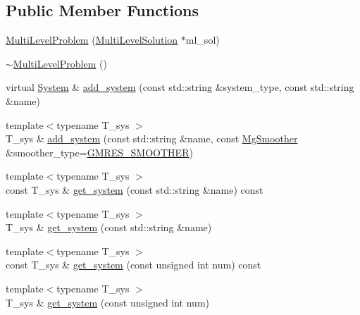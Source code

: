\subsection*{Public Member Functions}
\begin{DoxyCompactItemize}
\item 
\mbox{\hyperlink{classfemus_1_1_multi_level_problem_aa367975a9b81eff0bf3b0e80b487430b}{Multi\+Level\+Problem}} (\mbox{\hyperlink{classfemus_1_1_multi_level_solution}{Multi\+Level\+Solution}} $\ast$ml\+\_\+sol)
\item 
\mbox{\hyperlink{classfemus_1_1_multi_level_problem_ae9bb227f875361546c16e74b700fa405}{$\sim$\+Multi\+Level\+Problem}} ()
\item 
virtual \mbox{\hyperlink{classfemus_1_1_system}{System}} \& \mbox{\hyperlink{classfemus_1_1_multi_level_problem_ad54bc6b7254d2331491ac48b58a2d9e3}{add\+\_\+system}} (const std\+::string \&system\+\_\+type, const std\+::string \&name)
\item 
{\footnotesize template$<$typename T\+\_\+sys $>$ }\\T\+\_\+sys \& \mbox{\hyperlink{classfemus_1_1_multi_level_problem_a1bad05c602350e01f8dbc865d0af3962}{add\+\_\+system}} (const std\+::string \&name, const \mbox{\hyperlink{_mg_smoother_enum_8hpp_a4d11c2ff93e2f0f440c879a9c40cda71}{Mg\+Smoother}} \&smoother\+\_\+type=\mbox{\hyperlink{_mg_smoother_enum_8hpp_a4d11c2ff93e2f0f440c879a9c40cda71a26fb8f97b66d2d778bf41c32a9899191}{G\+M\+R\+E\+S\+\_\+\+S\+M\+O\+O\+T\+H\+ER}})
\item 
{\footnotesize template$<$typename T\+\_\+sys $>$ }\\const T\+\_\+sys \& \mbox{\hyperlink{classfemus_1_1_multi_level_problem_a3d90edba93be2c202ea2bf8e87e20854}{get\+\_\+system}} (const std\+::string \&name) const
\item 
{\footnotesize template$<$typename T\+\_\+sys $>$ }\\T\+\_\+sys \& \mbox{\hyperlink{classfemus_1_1_multi_level_problem_a7412d0cf202758b1477f4b75f76208aa}{get\+\_\+system}} (const std\+::string \&name)
\item 
{\footnotesize template$<$typename T\+\_\+sys $>$ }\\const T\+\_\+sys \& \mbox{\hyperlink{classfemus_1_1_multi_level_problem_a9a964b09c5762cc0d7c3569385126b4a}{get\+\_\+system}} (const unsigned int num) const
\item 
{\footnotesize template$<$typename T\+\_\+sys $>$ }\\T\+\_\+sys \& \mbox{\hyperlink{classfemus_1_1_multi_level_problem_ae2ead158185a53358bb5f5bd84d4f267}{get\+\_\+system}} (const unsigned int num)

\end{DoxyCompactItemize}
